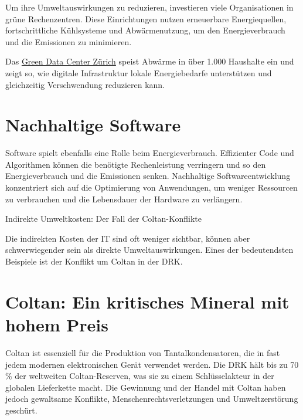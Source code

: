\documentclass[
  nswissgerman,
  a4paper,
  DIV=11,
  numbers=noendperiod,
  ngerman]{scrreprt}
\begin{document}
Um ihre Umweltauswirkungen zu reduzieren, investieren viele
Organisationen in grüne Rechenzentren. Diese Einrichtungen nutzen
erneuerbare Energiequellen, fortschrittliche Kühlsysteme und
Abwärmenutzung, um den Energieverbrauch und die Emissionen zu
minimieren.

\begin{tcolorbox}[enhanced jigsaw, arc=.35mm, bottomrule=.15mm, bottomtitle=1mm, breakable, colback=white, colbacktitle=quarto-callout-tip-color!10!white, colframe=quarto-callout-tip-color-frame, coltitle=black, left=2mm, leftrule=.75mm, opacityback=0, opacitybacktitle=0.6, rightrule=.15mm, title=\textcolor{quarto-callout-tip-color}{\faLightbulb}\hspace{0.5em}{Schweizer Beispiel}, titlerule=0mm, toprule=.15mm, toptitle=1mm]

Das
\href{https://www.green.ch/de/ueber-green/so-handeln-wir/energieeffizenz}{Green
Data Center Zürich} speist Abwärme in über 1.000 Haushalte ein und zeigt
so, wie digitale Infrastruktur lokale Energiebedarfe unterstützen und
gleichzeitig Verschwendung reduzieren kann.

\end{tcolorbox}

\section{Nachhaltige Software}\label{nachhaltige-software}

Software spielt ebenfalls eine Rolle beim Energieverbrauch. Effizienter
Code und Algorithmen können die benötigte Rechenleistung verringern und
so den Energieverbrauch und die Emissionen senken. Nachhaltige
Softwareentwicklung konzentriert sich auf die Optimierung von
Anwendungen, um weniger Ressourcen zu verbrauchen und die Lebensdauer
der Hardware zu verlängern.

Indirekte Umweltkosten: Der Fall der Coltan-Konflikte

Die indirekten Kosten der IT sind oft weniger sichtbar, können aber
schwerwiegender sein als direkte Umweltauswirkungen. Eines der
bedeutendsten Beispiele ist der Konflikt um Coltan in der DRK.

\section{Coltan: Ein kritisches Mineral mit hohem
Preis}\label{coltan-ein-kritisches-mineral-mit-hohem-preis}

Coltan ist essenziell für die Produktion von Tantalkondensatoren, die in
fast jedem modernen elektronischen Gerät verwendet werden. Die DRK hält
bis zu 70 \% der weltweiten Coltan-Reserven, was sie zu einem
Schlüsselakteur in der globalen Lieferkette macht. Die Gewinnung und der
Handel mit Coltan haben jedoch gewaltsame Konflikte,
Menschenrechtsverletzungen und Umweltzerstörung geschürt.
\end{document}
